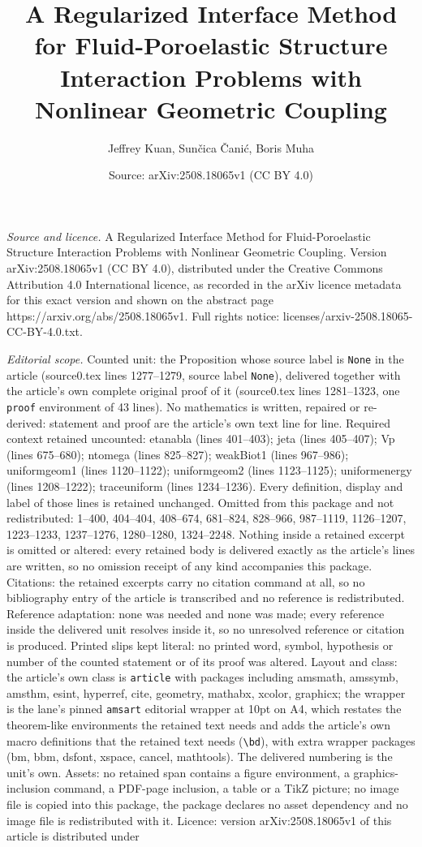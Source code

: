 \documentclass[10pt,a4paper]{amsart}
\title[A Regularized Interface Method for Fluid-Poroelastic Structu]{A Regularized Interface Method for Fluid-Poroelastic Structure Interaction Problems with Nonlinear Geometric Coupling}
\author{Jeffrey Kuan, Sun\v{c}ica \v{C}ani\'c, Boris Muha}
\date{Source: arXiv:2508.18065v1 (CC BY 4.0)}
\begin{document}
\maketitle

\noindent\emph{Source and licence.} A Regularized Interface Method for Fluid-Poroelastic Structure Interaction Problems with Nonlinear Geometric Coupling. Version arXiv:2508.18065v1 (CC BY 4.0), distributed under the Creative Commons Attribution 4.0 International licence, as recorded in the arXiv licence metadata for this exact version and shown on the abstract page https://arxiv.org/abs/2508.18065v1. Full rights notice: licenses/arxiv-2508.18065-CC-BY-4.0.txt.\par\smallskip

\noindent\textit{Editorial scope.} Counted unit: the Proposition whose source label is \texttt{None} in the article (source0.tex lines 1277--1279, source label \texttt{None}), delivered together with the article's own complete original proof of it (source0.tex lines 1281--1323, one \texttt{proof} environment of 43 lines). No mathematics is written, repaired or re-derived: statement and proof are the article's own text line for line. Required context retained uncounted: etanabla (lines 401--403); jeta (lines 405--407); Vp (lines 675--680); ntomega (lines 825--827); weakBiot1 (lines 967--986); uniformgeom1 (lines 1120--1122); uniformgeom2 (lines 1123--1125); uniformenergy (lines 1208--1222); traceuniform (lines 1234--1236). Every definition, display and label of those lines is retained unchanged. Omitted from this package and not redistributed: 1--400, 404--404, 408--674, 681--824, 828--966, 987--1119, 1126--1207, 1223--1233, 1237--1276, 1280--1280, 1324--2248. Nothing inside a retained excerpt is omitted or altered: every retained body is delivered exactly as the article's lines are written, so no omission receipt of any kind accompanies this package. Citations: the retained excerpts carry no citation command at all, so no bibliography entry of the article is transcribed and no reference is redistributed. Reference adaptation: none was needed and none was made; every reference inside the delivered unit resolves inside it, so no unresolved reference or citation is produced. Printed slips kept literal: no printed word, symbol, hypothesis or number of the counted statement or of its proof was altered. Layout and class: the article's own class is \texttt{article} with packages including amsmath, amssymb, amsthm, esint, hyperref, cite, geometry, mathabx, xcolor, graphicx; the wrapper is the lane's pinned \texttt{amsart} editorial wrapper at 10pt on A4, which restates the theorem-like environments the retained text needs and adds the article's own macro definitions that the retained text needs (\texttt{\textbackslash bd}), with extra wrapper packages (bm, bbm, dsfont, xspace, cancel, mathtools). The delivered numbering is the unit's own. Assets: no retained span contains a figure environment, a graphics-inclusion command, a PDF-page inclusion, a table or a TikZ picture; no image file is copied into this package, the package declares no asset dependency and no image file is redistributed with it. Licence: version arXiv:2508.18065v1 of this article is distributed under 
\end{document}
